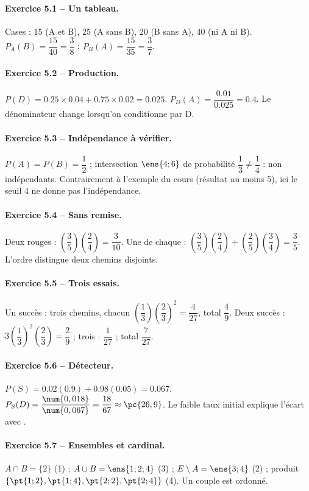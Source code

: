 \paragraph{Exercice 5.1 -- Un tableau.} Cases : 15 (A et B), 25 (A sans B), 20 (B sans A), 40 (ni A ni B). $P_A(B)=\dfrac{15}{40}=\dfrac{3}{8}$ ; $P_B(A)=\dfrac{15}{35}=\dfrac{3}{7}$.
\paragraph{Exercice 5.2 -- Production.} $P(D)=\num{0,25}\times\num{0,04}+\num{0,75}\times\num{0,02}=\num{0,025}$. $P_D(A)=\dfrac{\num{0,01}}{\num{0,025}}=\num{0,4}$. Le dénominateur change lorsqu’on conditionne par D.
\paragraph{Exercice 5.3 -- Indépendance à vérifier.} $P(A)=P(B)=\dfrac{1}{2}$ ; intersection $\ens{4;6}$ de probabilité $\dfrac{1}{3}\ne \dfrac{1}{4}$ : non indépendants. Contrairement à l’exemple du cours (résultat au moins 5), ici le seuil 4 ne donne pas l’indépendance.
\paragraph{Exercice 5.4 -- Sans remise.} Deux rouges : $(\dfrac{3}{5})(\dfrac{2}{4})=\dfrac{3}{10}$. Une de chaque : $(\dfrac{3}{5})(\dfrac{2}{4})+(\dfrac{2}{5})(\dfrac{3}{4})=\dfrac{3}{5}$. L’ordre distingue deux chemins disjoints.
\paragraph{Exercice 5.5 -- Trois essais.} Un succès : trois chemins, chacun $(\dfrac{1}{3})(\dfrac{2}{3})^2=\dfrac{4}{27}$, total $\dfrac{4}{9}$. Deux succès : $3(\dfrac{1}{3})^2(\dfrac{2}{3})=\dfrac{2}{9}$ ; trois : $\dfrac{1}{27}$ ; total $\dfrac{7}{27}$.
\paragraph{Exercice 5.6 -- Détecteur.} $P(S)=\num{0,02}(\num{0,9})+\num{0,98}(\num{0,05})=\num{0,067}$. $P_S(D)=\dfrac{\num{0,018}}{\num{0,067}}=\dfrac{18}{67}\approx \pc{26,9}$. Le faible taux initial explique l’écart avec .
\paragraph{Exercice 5.7 -- Ensembles et cardinal.} $A\cap B=\{2\}$ (1) ; $A\cup B=\ens{1;2;4}$ (3) ; $E\setminus A=\ens{3;4}$ (2) ; produit $\{\pt{1;2},\pt{1;4},\pt{2;2},\pt{2;4}\}$ (4). Un couple est ordonné.
